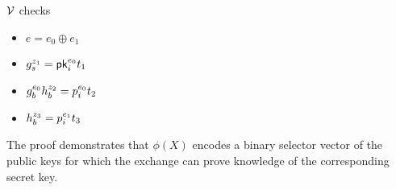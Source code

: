 \begin{Protocol*}[t!]
\begin{framed}
\begin{enumerate}
\begin{enumerate}
\begin{framed}
        \item $\mathcal{V}$ checks
        \begin{itemize}
        \item $e=e_0\oplus{e_1}$
        \item $g_s^{z_1}=\mathsf{pk}_i^{e_0}t_1$ 
        \item $g_b^{e_0}h_b^{z_2}=p_i^{e_0}t_2$ 
        \item $h_b^{z_3}=p_i^{e_1}t_3$
        \end{itemize}  
    \end{framed}
    \end{enumerate}
    
    \end{enumerate}
    \normalsize	
    \end{framed}
    \caption{The \bootstrap proof demonstrates that $\phi(X)$ encodes a binary selector vector of the public keys for which the exchange can prove knowledge of the corresponding secret key. \label{alg:boot}}
    \end{Protocol*}
    